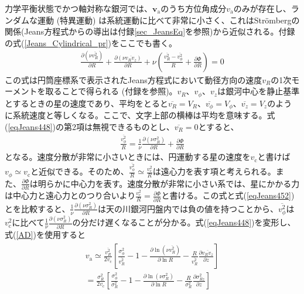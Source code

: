 力学平衡状態でかつ軸対称な銀河では、$\pmb{v}_{\mathrm{a}}$のうち方位角成分$v_{\mathrm{a}}$のみが存在し、ランダムな運動 (特異運動) は系統運動に比べて非常に小さく、これはStr\"{o}mbergの関係(Jeans方程式からの導出は付録\ref{sec_JeansEq}を参照)から近似される。付録の式(\ref{Jeans_Cylindrical_pr})をここでも書く。
\begin{align}
	\frac{\partial (\nu \overline{v_R^2})}{\partial R} + \frac{\partial (\nu \overline{v_R v_z})}{\partial R} + \nu\left(\frac{\overline{v_R^2} - \overline{v_{\phi}^2}}{R} + \frac{\partial \Phi}{\partial R} \right) = 0 \label{eqJeans448}
\end{align}
この式は円筒座標系で表示されたJeans方程式において動径方向の速度$v_R$の1次モーメントを取ることで得られる (付録を参照)。$v_R、v_{\phi}、v_z$は銀河中心を静止基準とするときの星の速度であり、平均をとると$\overline{v_R}=V_R、\overline{v_{\phi}}=V_{\phi}、\overline{v_z}=V_z$のように系統速度と等しくなる。ここで、文字上部の横棒は平均を意味する。式(\ref{eqJeans448})の第2項は無視できるものとし、$\overline{v_R}=0$とすると、
\begin{align}
	\frac{\overline{v_{\phi}^2}}{R} = \frac{1}{\nu}\frac{\partial(\nu\sigma_R^2)}{\partial R} + \frac{\partial \Phi}{\partial R} \label{eqJeans452}
\end{align}
となる。速度分散が非常に小さいときには、円運動する星の速度を$v_{\mathrm{c}}$と書けば$v_{\phi}\simeq v_{\mathrm{c}}$と近似できる。そのため、$\frac{\overline{v_{\phi}^2}}{R}\simeq \frac{v_{\mathrm{c}}^2}{R} $は遠心力を表す項と考えられる。また、$\frac{\partial \Phi}{\partial R}$は明らかに中心力を表す。速度分散が非常に小さい系では、星にかかる力は中心力と遠心力とのつり合いより$\frac{v_{\mathrm{c}}^2}{R}=\frac{\partial \Phi}{\partial R}$と書ける。この式と式(\ref{eqJeans452})とを比較すると、$\frac{1}{\nu}\frac{\partial(\nu\sigma_R^2)}{\partial R}$は天の川銀河円盤内では負の値を持つことから、$\overline{v_{\phi}^2}$は$v_{\mathrm{c}}^2$に比べて$\frac{1}{\nu}\frac{\partial(\nu\sigma_R^2)}{\partial R}$の分だけ遅くなることが分かる。式(\ref{eqJeans448})を変形し、式(\ref{AD})を使用すると
\begin{align}
\begin{aligned}
    v_{\mathrm{a}} \simeq \frac{\overline{v_R^2}}{2v_{\mathrm{c}}} \left[\frac{\sigma_{\phi}^2}{\overline{v_R^2}} - 1 - \frac{\partial \ln(\nu \overline{v_R^2})}{\partial \ln R} - \frac{R}{\overline{v_R^2}}\frac{\partial \overline{v_R v_z}}{\partial z}\right] \\
    = \frac{\sigma_R^2}{2v_{\mathrm{c}}} \left[\frac{\sigma_{\phi}^2}{\sigma_R^2} - 1 - \frac{\partial \ln(\nu \sigma_R^2)}{\partial \ln R} - \frac{R}{\sigma_R^2}\frac{\partial \sigma_{Rz}^2}{\partial z}\right]
\end{aligned} \label{AD2}
\end{align}
